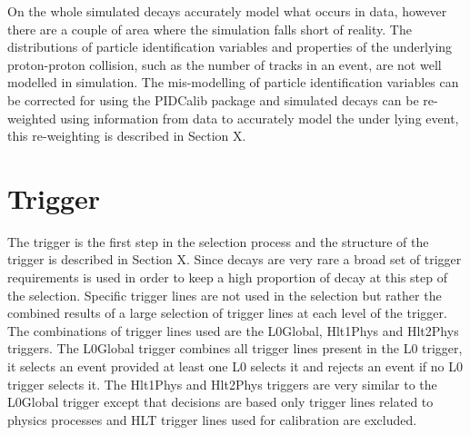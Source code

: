 On the whole simulated decays accurately model what occurs in data, however there are a couple of area where the simulation falls short of reality.
The distributions of particle identification variables and properties of the underlying proton-proton collision, such as the number of tracks in an event, are not well modelled in simulation. %
The mis-modelling of particle identification variables can be corrected for using the PIDCalib package and simulated decays can be re-weighted using information from data to accurately model the under lying event, this re-weighting is described in Section X. 


\section{Trigger}
\label{sec:triggerRequirements}

The trigger is the first step in the selection process and the structure of the trigger is described in Section X. Since \bsmumu decays are very rare a broad set of trigger requirements is used in order to keep a high proportion of \bsmumu decay at this step of the selection. Specific trigger lines are not used in the selection but rather the combined results of a large selection of trigger lines at each level of the trigger. The combinations of trigger lines used are the L0Global, Hlt1Phys and Hlt2Phys triggers. The L0Global trigger combines all trigger lines present in the L0 trigger, it selects an event provided at least one L0 selects it and rejects an event if no L0 trigger selects it. The Hlt1Phys and Hlt2Phys triggers are very similar to the L0Global trigger except that decisions are based only trigger lines related to physics processes and HLT trigger lines used for calibration are excluded. 

